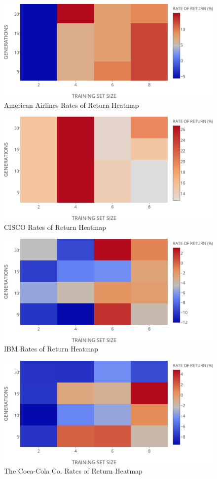 \documentclass[12pt,journal,draftcls,onecolumn]{IEEEtran}
\begin{document}
\begin{figure}[htp]
\caption{American Airlines Rates of Return Heatmap}
\label{aa-ror-heatmap}
\begin{center}
\includegraphics[width=0.5\columnwidth]{figures/rates-of-return-aa-heatmap/rates-of-return-aa-heatmap.png}
\end{center}
\end{figure}

\begin{figure}[htp]
\caption{CISCO Rates of Return Heatmap}
\label{csco-ror-heatmap}
\begin{center}
\includegraphics[width=0.5\columnwidth]{figures/rates-of-return-csco-heatmap/rates-of-return-csco-heatmap.png}
\end{center}
\end{figure}

\begin{figure}[htp]
\caption{IBM Rates of Return Heatmap}
\label{ibm-ror-heatmap}
\begin{center}
\includegraphics[width=0.5\columnwidth]{figures/rates-of-return-ibm-heatmap/rates-of-return-ibm-heatmap.png}
\end{center}
\end{figure}

\begin{figure}[htp]
\caption{The Coca-Cola Co. Rates of Return Heatmap}
\label{ko-ror-heatmap}
\begin{center}
\includegraphics[width=0.5\columnwidth]{figures/rates-of-return-ko-heatmap/rates-of-return-ko-heatmap.png}
\end{center}
\end{figure}
\end{document}
